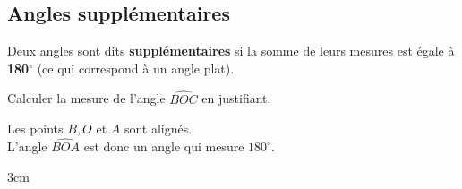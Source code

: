 \documentclass[a4paper]{book}
\begin{document}
    
\newpage
    
    
\subsection{Angles supplémentaires}
    
    \begin{definition}
        Deux angles sont dits \textbf{supplémentaires} si la somme de leurs mesures est égale à \textbf{180}$^\circ$ (ce qui correspond à un angle plat).
    \end{definition}
    
    \begin{exemple}
        Calculer la mesure de l'angle $\widehat{BOC}$ en justifiant.
        
        \begin{minipage}{0.40\textwidth}
            \begin{center}
            \end{center}
        \end{minipage}
        \hfill
        \begin{minipage}{0.55\textwidth}
            Les points $B, O$ et $A$ sont alignés. \\
            L'angle $\widehat{BOA}$ est donc un angle \points[4] qui mesure $180^\circ$. \\
        \end{minipage}

        \begin{ZoneReponse}{3cm}
        \end{ZoneReponse}
        
    \end{exemple}
    
\end{document}
